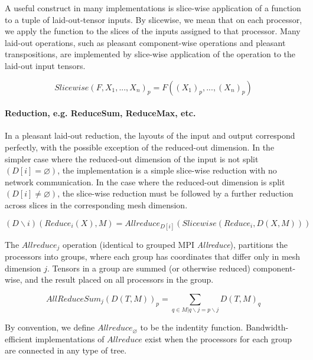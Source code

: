 \documentclass{article}
\def \O {\varnothing}
\begin{document}
\begin{itemize}
A useful construct in many implementations is slice-wise application of a function to a tuple of laid-out-tensor inputs.  By slicewise, we mean that on each processor, we apply the function to the slices of the inputs assigned to that processor.   Many laid-out operations, such as pleasant component-wise operations and pleasant transpositions, are implemented by slice-wise application of the operation to the laid-out input tensors.

\begin{equation}
 Slicewise(F, X_1, ...,  X_n)_p = F((X_1)_p, ..., (X_n)_p)
\end{equation}





\paragraph{Reduction, e.g. ReduceSum, ReduceMax, etc.}

In a pleasant laid-out reduction, the layouts of the input and output correspond perfectly, with the possible exception of the reduced-out dimension. In the simpler case where the reduced-out dimension of the input is not split $(D[i]=\O)$, the implementation is a simple slice-wise reduction with no network communication.  In the case where the reduced-out dimension is split $(D[i] \neq \O)$, the slice-wise reduction must be followed by a further reduction across slices in the corresponding mesh dimension.  



\begin{equation}
(D\backslash i)(Reduce_i(X), M) = Allreduce_{D[i]}(Slicewise(Reduce_i, D(X, M)))
\end{equation}

The $Allreduce_j$ operation (identical to grouped MPI \textit{Allreduce}), partitions the processors into groups, where each group has coordinates that differ only in mesh dimension $j$.  Tensors in a group are summed (or otherwise reduced) component-wise, and the result placed on all processors in the group.  

\begin{equation}
    AllReduceSum_j(D(T, M))_p = \sum_{q \in M |q\backslash j = p \backslash j} D(T,M)_q
\end{equation}

By convention, we define $Allreduce_{\O}$ to be the indentity function.  Bandwidth-efficient implementations of $Allreduce$ exist when the processors for each group are connected in any type of tree. \cite{Patarasuk2009} \cite{Jain10y.:optimal}


\end{itemize}
\end{document}

